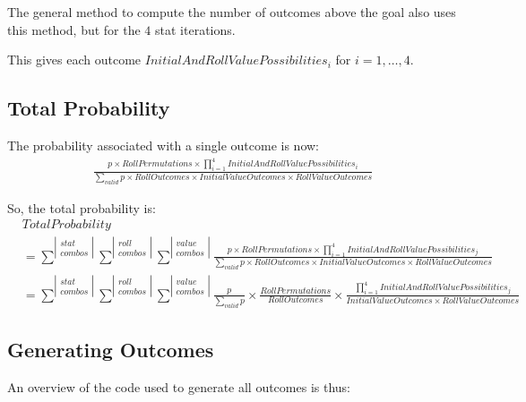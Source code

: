 \documentclass[12pt]{article}
\begin{document}
The general method to compute the number of outcomes above the goal also uses this method, but for the $4$ stat iterations.

This gives each outcome $InitialAndRollValuePossibilities_i$ for $i = 1, \dots, 4$.

\subsection{Total Probability}

The probability associated with a single outcome is now:
\begin{align*}
	\frac{p \times RollPermutations \times \prod_{i = 1}^{4} InitialAndRollValuePossibilities_i}{\sum_{valid} p \times RollOutcomes \times InitialValueOutcomes \times RollValueOutcomes}
\end{align*}

So, the total probability is:
\small
\begin{align*}
	&TotalProbability \\[8pt]
	&= \sum^{|\substack{stat \\ combos}|} \sum^{|\substack{roll \\ combos}|} \sum^{|\substack{value \\ combos}|} \frac{p \times RollPermutations \times \prod_{i = 1}^{4} InitialAndRollValuePossibilities_j}{\sum_{valid} p \times RollOutcomes \times InitialValueOutcomes \times RollValueOutcomes} \\[12pt]
	&= \sum^{|\substack{stat \\ combos}|} \sum^{|\substack{roll \\ combos}|} \sum^{|\substack{value \\ combos}|} \frac{p}{\sum_{valid} p}\times\frac{RollPermutations}{RollOutcomes}\times\frac{\prod_{i = 1}^{4} InitialAndRollValuePossibilities_j}{InitialValueOutcomes \times RollValueOutcomes}
\end{align*}
\normalsize

\pagebreak
\subsection{Generating Outcomes}

An overview of the code used to generate all outcomes is thus:
\end{document}
